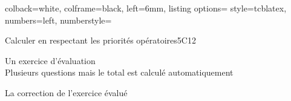 \begin{tcblisting}{
    colback=white,
    colframe=black,
    left=6mm,
    listing options={
        style=tcblatex,
        numbers=left,
        numberstyle=\tiny\color{red!75!black}
    }
}
\def\rdifficulty{1}
\displaybaremepointstrue %

\begin{EXOEVAL}{Calculer en respectant les priorités opératoires}{5C12}

 Un exercice d'évaluation\\
 Plusieurs questions mais le total est calculé automatiquement


\exocorrection

    
La correction de l'exercice évalué

\end{EXOEVAL}

\end{tcblisting}